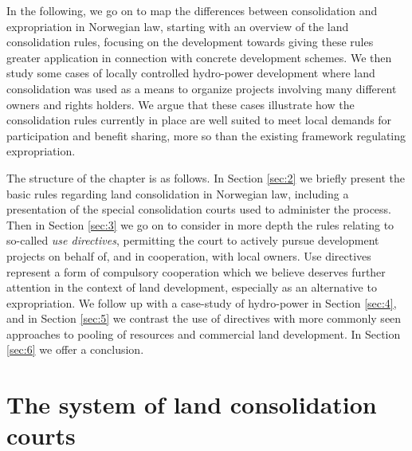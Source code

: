 In the following, we go on to map the differences between consolidation and expropriation in Norwegian law, starting with an overview of the land consolidation rules, focusing on the development towards giving these rules greater application in connection with concrete development schemes. We then study some cases of locally controlled hydro-power development where land consolidation was used as a means to organize projects involving many different owners and rights holders. We argue that these cases illustrate how the consolidation rules currently in place are well suited to meet local demands for participation and benefit sharing, more so than the existing framework regulating expropriation.

The structure of the chapter is as follows. In Section \ref{sec:2} we briefly present the basic rules regarding land consolidation in Norwegian law, including a presentation of the special consolidation courts used to administer the process. Then in Section \ref{sec:3} we go on to consider in more depth the rules relating to so-called \emph{use directives}, permitting the court to actively pursue development projects on behalf of, and in cooperation, with local owners. Use directives represent a form of compulsory cooperation which we believe deserves further attention in the context of land development, especially as an alternative to expropriation. We follow up with a case-study of hydro-power in Section \ref{sec:4}, and in Section \ref{sec:5} we contrast the use of directives with more commonly seen approaches to pooling of resources and commercial land development. In Section \ref{sec:6} we offer a conclusion.

\section{The system of land consolidation courts}

